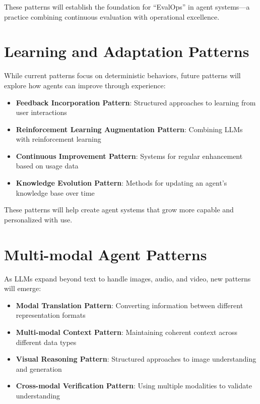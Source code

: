 \documentclass[11pt,oneside]{book}
\providecommand{\tightlist}{%
  \setlength{\itemsep}{0pt}\setlength{\parskip}{0pt}}
\begin{document}
These patterns will establish the foundation for ``EvalOps'' in agent
systems---a practice combining continuous evaluation with operational
excellence.

\section{Learning and Adaptation
Patterns}\label{learning-and-adaptation-patterns}

While current patterns focus on deterministic behaviors, future patterns
will explore how agents can improve through experience:

\begin{itemize}
\tightlist
\item
  \textbf{Feedback Incorporation Pattern}: Structured approaches to
  learning from user interactions
\item
  \textbf{Reinforcement Learning Augmentation Pattern}: Combining LLMs
  with reinforcement learning
\item
  \textbf{Continuous Improvement Pattern}: Systems for regular
  enhancement based on usage data
\item
  \textbf{Knowledge Evolution Pattern}: Methods for updating an agent's
  knowledge base over time
\end{itemize}

These patterns will help create agent systems that grow more capable and
personalized with use.

\section{Multi-modal Agent Patterns}\label{multi-modal-agent-patterns}

As LLMs expand beyond text to handle images, audio, and video, new
patterns will emerge:

\begin{itemize}
\tightlist
\item
  \textbf{Modal Translation Pattern}: Converting information between
  different representation formats
\item
  \textbf{Multi-modal Context Pattern}: Maintaining coherent context
  across different data types
\item
  \textbf{Visual Reasoning Pattern}: Structured approaches to image
  understanding and generation
\item
  \textbf{Cross-modal Verification Pattern}: Using multiple modalities
  to validate understanding
\end{itemize}
\end{document}
